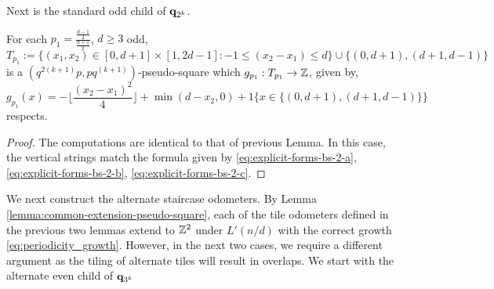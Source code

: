 \documentclass[12pt]{amsart}
\begin{document}
Next is the standard odd child of $\mathbf{q}_{2^k}$. 
\begin{lemma} \label{lemma:basecase_2k_odd_std}
	For each $p_1 = \frac{\frac{d-1}{2}}{\frac{d+1}{2}}$, $d \geq 3$ odd,
	\[
	T_{p_1} := \{ (x_1,x_2) \in [0,d+1] \times [1,2d-1]:  -1 \leq (x_2-x_1) \leq d\} \cup  \{ (0, d+1), (d+1, d-1)\}
	\]
	is a $(q^{2(k+1)}p,p q^{(k+1)})$-pseudo-square which $g_{p_1}:T_{p_1} \to \mathbb{Z}$, given by, 
	\[
	g_{p_1}(x) = -\lfloor \frac{(x_2-x_1)^2}{4} \rfloor + \min(d-x_2,0) + 1\{x \in \{ (0, d+1), (d+1, d-1)\} \} 
	\]
	respects. 
\end{lemma}

\begin{proof}
The computations are identical to that of previous Lemma. In this case, the vertical strings match the formula
given by \eqref{eq:explicit-forms-bs-2-a}, \eqref{eq:explicit-forms-bs-2-b}, \eqref{eq:explicit-forms-bs-2-c}.
%
%
\end{proof}

We next construct the alternate staircase odometers. By Lemma \ref{lemma:common-extension-pseudo-square}, each of the tile odometers defined in the previous two lemmas extend to $\mathbb{Z}^2$ under $L'(n/d)$ with the correct growth \eqref{eq:periodicity_growth}. However, in the next two cases, we require a different argument as the tiling of alternate tiles will result in overlaps.  We start with the alternate even child of $\mathbf{q}_{3^k}$
\end{document}

